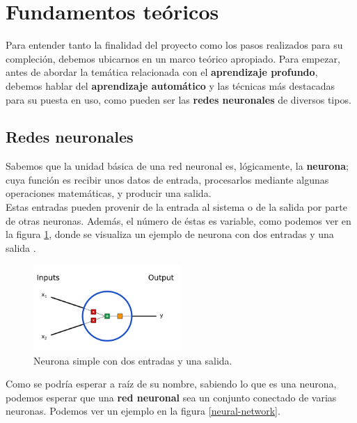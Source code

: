 \documentclass[]{article}
\begin{document}
\section{Fundamentos teóricos}

	Para entender tanto la finalidad del proyecto como los pasos realizados para su compleción, debemos ubicarnos en un marco teórico apropiado. Para empezar, antes de abordar la temática relacionada con el \textbf{aprendizaje profundo}, debemos hablar del \textbf{aprendizaje automático} y las técnicas más destacadas para su puesta en uso, como pueden ser las \textbf{redes neuronales} de diversos tipos.
	
	\subsection{Redes neuronales}
	
		Sabemos que la unidad básica de una red neuronal es, lógicamente, la \textbf{neurona}; cuya función es recibir unos datos de entrada, procesarlos mediante algunas operaciones matemáticas, y producir una salida.\\
		
		Estas entradas pueden provenir de la entrada al sistema o de la salida por parte de otras neuronas. Además, el número de éstas es variable, como podemos ver en la figura \ref{neuron}, donde se visualiza un ejemplo de neurona con dos entradas y una salida \cite{introduction-neural-networks}.\\
	
		\begin{figure}[h]
			\centering
			\includegraphics[width=0.5\textwidth]{./img/neuron}
			\caption{Neurona simple con dos entradas y una salida.}
			\label{neuron}
		\end{figure}
	
		Como se podría esperar a raíz de su nombre, sabiendo lo que es una neurona, podemos esperar que una \textbf{red neuronal} sea un conjunto conectado de varias neuronas. Podemos ver un ejemplo en la figura \ref{neural-network}.\\
		
\end{document}
